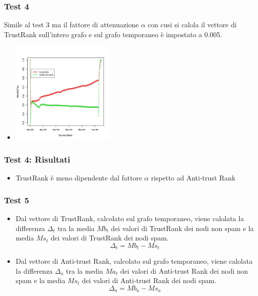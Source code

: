 \documentclass{beamer}
\begin{document}
\begin{frame}
\frametitle{Test 4}
Simile al test 3 ma il fattore di attenuazione \(\alpha\) con cusi si calola il vettore di TrustRank sull'intero grafo e sul grafo temporaneo è impostato a 0.005.
\begin{itemize}
  \item<2-> \begin{center}
 \includegraphics[height=5cm]{immagini/test4/coplotTrustAnti_Mode1_set3776_62_alpha0005}
\end{center}
 \end{itemize}
\end{frame}
\begin{frame}
\frametitle{Test 4: Risultati}
\begin{itemize}
 \item<1-> TrustRank è meno dipendente dal fattore \(\alpha\) rispetto ad Anti-trust Rank
 \end{itemize}
\end{frame}
\begin{frame}
\frametitle{Test 5}
\begin{itemize}
 \item Dal vettore di TrustRank,  calcolato sul grafo temporaneo, viene calolata la differenza \(\Delta_t\) tra la media \(Mb_t\) dei valori di TrustRank dei nodi non spam e la media \(Ms_t\) dei valori di TrustRank dei nodi spam.
 \begin{equation}
 \Delta_t = Mb_t-Ms_t
\end{equation}
  \item Dal vettore di Anti-trust Rank,  calcolato sul grafo temporaneo, viene calolata la differenza \(\Delta_a\) tra la media \(Ma_t\) dei valori di Anti-trust Rank dei nodi non spam e la media \(Ms_t\) dei valori di Anti-trust Rank dei nodi spam.
  \begin{equation}
 \Delta_a=Mb_a-Ms_a
\end{equation}
\end{itemize}
\end{frame}
\end{document}
